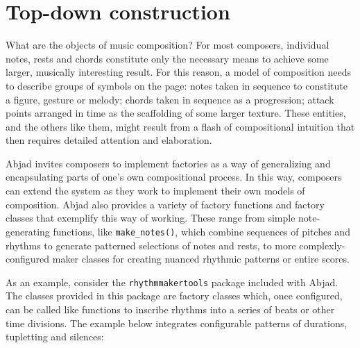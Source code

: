\documentclass{article}
\begin{document}

\section{Top-down construction} \label{sec:top-down}

What are the objects of music composition? For most composers, individual
notes, rests and chords constitute  only the necessary means to achieve some
larger, musically interesting result. For this reason, a model of composition
needs to describe groups of symbols on the page: notes taken in sequence to
constitute a figure, gesture or melody; chords taken in sequence as a
progression; attack points arranged in time as the scaffolding of some larger
texture. These entities, and the others like them, might result from a flash of
compositional intuition that then requires detailed attention and elaboration.

Abjad invites composers to implement factories as a way of generalizing and
encapsulating parts of one's own compositional process. In this way, composers
can extend the system as they work to implement their own models of
composition. Abjad also provides a variety of factory functions and factory
classes that exemplify this way of working. These range from simple
note-generating functions, like \texttt{make\_notes()}, which combine sequences
of pitches and rhythms to generate patterned selections of notes and rests, to
more complexly-configured maker classes for creating nuanced rhythmic patterns
or entire scores.

As an example, consider the \texttt{rhythmmakertools} package included with
Abjad. The classes provided in this package are factory classes which, once
configured, can be called like functions to inscribe rhythms into a series of
beats or other time divisions. The example below integrates configurable
patterns of durations, tupletting and silences:

\end{document}
